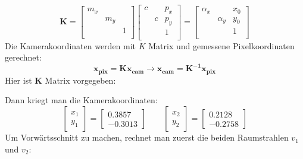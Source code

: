 \documentclass[12pt]{article}
\begin{document}
\begin{equation*}
\bm{K} = \begin{bmatrix}
m_x & \ & \ \\
\ & m_y & \ \\
\ & \ & 1 \\  
\end{bmatrix} \begin{bmatrix}
c & \ & p_x \\
\ & c & p_y \\
\ & \ & 1 \\
\end{bmatrix} = \begin{bmatrix}
\alpha_x & \ & x_0 \\
\ & \alpha_y & y_0 \\
\ & \ & 1 \\
\end{bmatrix}
\end{equation*}
Die Kamerakoordinaten werden mit $K$ Matrix und gemessene Pixelkoordinaten gerechnet:
\begin{equation*}
\bm{x_{pix}} = \bm{K} \bm{x_{cam}} \longrightarrow \bm{x_{cam}} = \bm{K^{-1}} \bm{x_{pix}}
\end{equation*}
\newpage
\noindent Hier ist $\bm{K}$ Matrix vorgegeben:
\begin{figure}[ht]\centering
\end{figure}
\newline
Dann kriegt man die Kamerakoordinaten: 
\begin{equation*}
\begin{bmatrix}
x_1 \\
y_1
\end{bmatrix} = \begin{bmatrix}
0.3857 \\
-0.3013
\end{bmatrix} \qquad \begin{bmatrix}
x_2 \\
y_2
\end{bmatrix} = \begin{bmatrix}
0.2128 \\
-0.2758
\end{bmatrix}
\end{equation*}
Um Vorwärtsschnitt zu machen, rechnet man zuerst die beiden Raumstrahlen $v_1$ und $v_2$:
\end{document}
